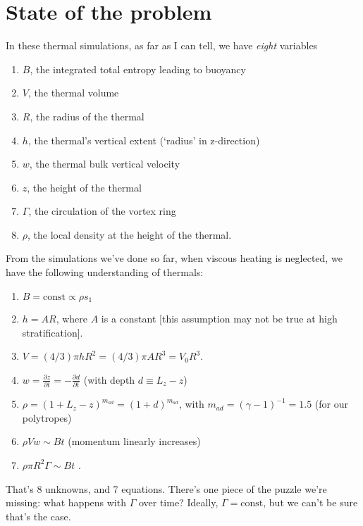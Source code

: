 \documentclass[onecolumn, amsmath, amsfonts, amssymb]{aastex62}
\begin{document}
\section{State of the problem}
In these thermal simulations, as far as I can tell, we have \emph{eight} variables
\begin{enumerate}
\item $B$, the integrated total entropy leading to buoyancy
\item $V$, the thermal volume
\item $R$, the radius of the thermal
\item $h$, the thermal's vertical extent (`radius' in z-direction)
\item $w$, the thermal bulk vertical velocity
\item $z$, the height of the thermal
\item $\Gamma$, the circulation of the vortex ring
\item $\rho$, the local density at the height of the thermal.
\end{enumerate}
From the simulations we've done so far, when viscous heating is neglected, we have the
following understanding of thermals:
\begin{enumerate}
\item $B = \text{const} \propto \rho s_1$
\item $h = A R$, where $A$ is a constant [this assumption may not be true at high stratification].
\item $V = (4/3)\pi h R^2 = (4/3)\pi A R^3 = V_0 R^3$.
\item $w = \frac{\partial z}{\partial t} = -\frac{\partial d}{\partial t}$ (with depth $d \equiv L_z - z$)
\item $\rho = (1 + L_z - z)^{m_{ad}} = (1 + d)^{m_{ad}}$, with $m_{ad} = (\gamma-1)^{-1} = 1.5$ (for our polytropes)
\item $\rho V w \sim B t$ (momentum linearly increases)
\item $\rho \pi R^2 \Gamma \sim B t$ \citep[e.g., eqn 36 of ][]{shivamoggi2010}.
\end{enumerate}
That's 8 unknowns, and 7 equations. There's one piece of the puzzle we're missing:
what happens with $\Gamma$ over time?
Ideally, $\Gamma = \text{const}$, but we can't be sure that's the case. 
\end{document}
